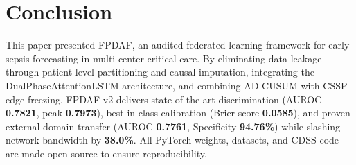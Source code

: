 \documentclass[10pt,a4paper,twocolumn,twoside]{article}
\begin{document}
\section{Conclusion}
This paper presented FPDAF, an audited federated learning framework for early sepsis forecasting in multi-center critical care. By eliminating data leakage through patient-level partitioning and causal imputation, integrating the DualPhaseAttentionLSTM architecture, and combining AD-CUSUM with CSSP edge freezing, FPDAF-v2 delivers state-of-the-art discrimination (AUROC \textbf{0.7821}, peak \textbf{0.7973}), best-in-class calibration (Brier score \textbf{0.0585}), and proven external domain transfer (AUROC \textbf{0.7761}, Specificity \textbf{94.76\%}) while slashing network bandwidth by \textbf{38.0\%}. All PyTorch weights, datasets, and CDSS code are made open-source to ensure reproducibility.



\end{document}
